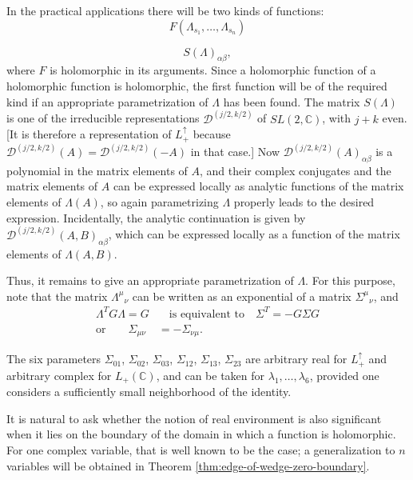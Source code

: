 In the practical applications there will be two kinds of functions:
\begin{equation}
  F(\Lambda_{s_1},\ldots,\Lambda_{s_n})
  \tag{2-60}\label{eq:ch2-lorentz-holomorphic-function}
\end{equation}

\begin{equation*}
  S(\Lambda)_{\alpha\beta},
\end{equation*}
where $F$ is holomorphic in its arguments.  Since a holomorphic function
of a holomorphic function is holomorphic, the first function will be of the
required kind if an appropriate parametrization of $\Lambda$ has been
found.  The matrix $S(\Lambda)$ is one of the irreducible representations
$\mathcal D^{(j/2,k/2)}$ of $SL(2,\mathbb{C})$, with $j+k$ even.  [It is therefore a
representation of $L^{\uparrow}_{+}$ because
$\mathcal D^{(j/2,k/2)}(A)=\mathcal D^{(j/2,k/2)}(-A)$ in that case.]  Now
$\mathcal D^{(j/2,k/2)}(A)_{\alpha\beta}$ is a polynomial in the matrix elements of
$A$, and their complex conjugates and the matrix elements of $A$ can be
expressed locally as analytic functions of the matrix elements of
$\Lambda(A)$, so again parametrizing $\Lambda$ properly leads to the
desired expression.  Incidentally, the analytic continuation is given by
$\mathcal D^{(j/2,k/2)}(A,B)_{\alpha\beta}$, which can be expressed locally as a
function of the matrix elements of $\Lambda(A,B)$.

Thus, it remains to give an appropriate parametrization of $\Lambda$.  For
this purpose, note that the matrix $\Lambda^\mu{}_{\nu}$ can be written as
an exponential of a matrix $\Sigma^\mu{}_{\nu}$, and
\begin{align*}
  \Lambda^T G\Lambda=G
  &\quad\text{is equivalent to}\quad
  \Sigma^T=-G\Sigma G \\
  \text{or}\qquad
  \Sigma_{\mu\nu}&=-\Sigma_{\nu\mu} .
\end{align*}

The six parameters $\Sigma_{01}$, $\Sigma_{02}$, $\Sigma_{03}$,
$\Sigma_{12}$, $\Sigma_{13}$, $\Sigma_{23}$ are arbitrary real for
$L^{\uparrow}_{+}$ and arbitrary complex for $L_{+}(\mathbb{C})$, and can
be taken for $\lambda_1,\ldots,\lambda_6$, provided one considers a
sufficiently small neighborhood of the identity.

It is natural to ask whether the notion of real environment is also
significant when it lies on the boundary of the domain in which a function
is holomorphic.  For one complex variable, that is well known to be the
case; a generalization to $n$ variables will be obtained in Theorem \ref{thm:edge-of-wedge-zero-boundary}.


